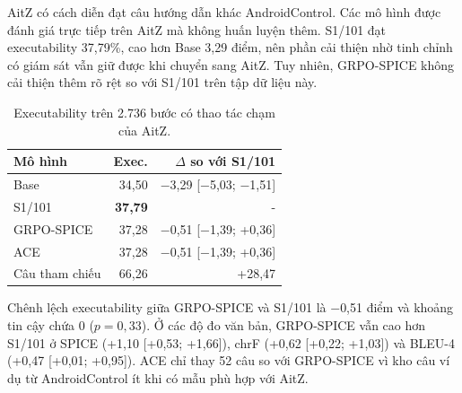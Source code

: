 AitZ có cách diễn đạt câu hướng dẫn khác AndroidControl. Các mô hình được đánh giá trực tiếp trên AitZ mà không huấn luyện thêm. S1/101 đạt executability 37,79\%, cao hơn Base 3,29 điểm, nên phần cải thiện nhờ tinh chỉnh có giám sát vẫn giữ được khi chuyển sang AitZ. Tuy nhiên, GRPO-SPICE không cải thiện thêm rõ rệt so với S1/101 trên tập dữ liệu này.

\begin{table}[htbp]
\centering\small
\caption{Executability trên 2.736 bước có thao tác chạm của AitZ.}\label{tab:6.aitz}
\begin{tabular}{@{}lrr@{}}
\toprule
\textbf{Mô hình} & \textbf{Exec.} & \textbf{$\Delta$ so với S1/101} \\
\midrule
Base & 34,50 & $-$3,29 [$-$5,03; $-$1,51] \\
S1/101 & \textbf{37,79} & - \\
GRPO-SPICE & 37,28 & $-$0,51 [$-$1,39; +0,36] \\
ACE & 37,28 & $-$0,51 [$-$1,39; +0,36] \\
\midrule
Câu tham chiếu & 66,26 & +28,47 \\
\bottomrule
\end{tabular}
\end{table}

Chênh lệch executability giữa GRPO-SPICE và S1/101 là $-$0,51 điểm và khoảng tin cậy chứa 0 ($p = 0{,}33$). Ở các độ đo văn bản, GRPO-SPICE vẫn cao hơn S1/101 ở SPICE (+1,10 [+0,53; +1,66]), chrF (+0,62 [+0,22; +1,03]) và BLEU-4 (+0,47 [+0,01; +0,95]). ACE chỉ thay 52 câu so với GRPO-SPICE vì kho câu ví dụ từ AndroidControl ít khi có mẫu phù hợp với AitZ.

